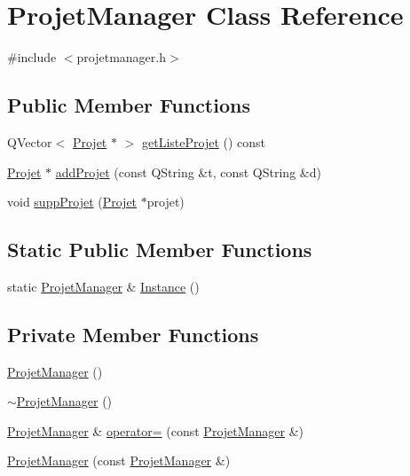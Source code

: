 \hypertarget{class_projet_manager}{}\section{Projet\+Manager Class Reference}
\label{class_projet_manager}


{\ttfamily \#include $<$projetmanager.\+h$>$}

\subsection*{Public Member Functions}
\begin{DoxyCompactItemize}
\item 
Q\+Vector$<$ \hyperlink{class_projet}{Projet} $\ast$ $>$ \hyperlink{class_projet_manager_a2b7281842b818a8e2cd85a81ef270930}{get\+Liste\+Projet} () const 
\item 
\hyperlink{class_projet}{Projet} $\ast$ \hyperlink{class_projet_manager_a1c547839afb77faaa3eb2f37e0c869a7}{add\+Projet} (const Q\+String \&t, const Q\+String \&d)
\item 
void \hyperlink{class_projet_manager_a7c76e23d621d3e904e3e2a1bdc4c176c}{supp\+Projet} (\hyperlink{class_projet}{Projet} $\ast$projet)
\end{DoxyCompactItemize}
\subsection*{Static Public Member Functions}
\begin{DoxyCompactItemize}
\item 
static \hyperlink{class_projet_manager}{Projet\+Manager} \& \hyperlink{class_projet_manager_ad61417127cad478ea812d560b18b975d}{Instance} ()
\end{DoxyCompactItemize}
\subsection*{Private Member Functions}
\begin{DoxyCompactItemize}
\item 
\hyperlink{class_projet_manager_a98d8ba59bd9bc6eec2ec5285102ac9a1}{Projet\+Manager} ()
\item 
\hyperlink{class_projet_manager_af5a44cde2f8d92f05bb7e52a18aa883a}{$\sim$\+Projet\+Manager} ()
\item 
\hyperlink{class_projet_manager}{Projet\+Manager} \& \hyperlink{class_projet_manager_a25b560fb4e617952ad093bbe74315aaa}{operator=} (const \hyperlink{class_projet_manager}{Projet\+Manager} \&)
\item 
\hyperlink{class_projet_manager_abfdc065f2c1819e13c8adc1562536f35}{Projet\+Manager} (const \hyperlink{class_projet_manager}{Projet\+Manager} \&)
\end{DoxyCompactItemize}
